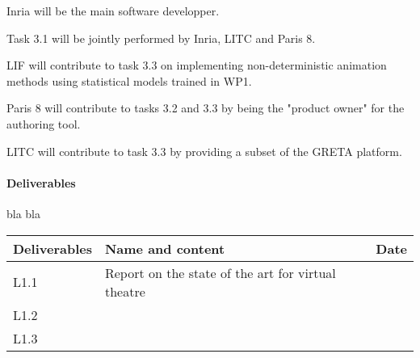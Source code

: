 Inria will be the main software developper.

Task 3.1 will be jointly performed by Inria, LITC and Paris 8.

LIF will contribute to task 3.3 on implementing non-deterministic animation 
methods using statistical models trained in WP1.

Paris 8 will contribute to tasks 3.2 and 3.3 by being the "product owner" for the authoring tool.

LITC will contribute to task   3.3 by providing a subset of the GRETA platform.





\paragraph{Deliverables}

bla bla

\begin{tabular}{|l|l|l|}\hline
Deliverables & Name and content  & Date  \\\hline
L1.1  & Report on the state of the art for virtual theatre & \\\hline
L1.2  &  & \\\hline
L1.3  &  & \\\hline
\end{tabular}


\endinput
